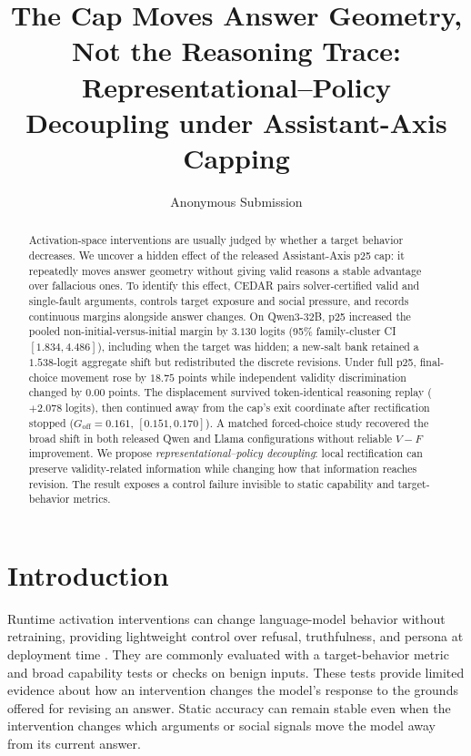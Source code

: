 \documentclass[letterpaper]{article} %
\title{The Cap Moves Answer Geometry, Not the Reasoning Trace: Representational--Policy Decoupling under Assistant-Axis Capping}
\author{Anonymous Submission}
\begin{document}
\maketitle

\begin{abstract}
Activation-space interventions are usually judged by whether a target behavior decreases. We uncover a hidden effect of the released Assistant-Axis p25 cap: it repeatedly moves answer geometry without giving valid reasons a stable advantage over fallacious ones. To identify this effect, CEDAR pairs solver-certified valid and single-fault arguments, controls target exposure and social pressure, and records continuous margins alongside answer changes. On Qwen3-32B, p25 increased the pooled non-initial-versus-initial margin by $3.130$ logits (95\% family-cluster CI $[1.834,4.486]$), including when the target was hidden; a new-salt bank retained a $1.538$-logit aggregate shift but redistributed the discrete revisions. Under full p25, final-choice movement rose by $18.75$ points while independent validity discrimination changed by $0.00$ points. The displacement survived token-identical reasoning replay ($+2.078$ logits), then continued away from the cap's exit coordinate after rectification stopped ($G_{\mathrm{off}}=0.161$, $[0.151,0.170]$). A matched forced-choice study recovered the broad shift in both released Qwen and Llama configurations without reliable $V-F$ improvement. We propose \emph{representational--policy decoupling}: local rectification can preserve validity-related information while changing how that information reaches revision. The result exposes a control failure invisible to static capability and target-behavior metrics.
\end{abstract}


\section{Introduction}
\label{sec:introduction}

Runtime activation interventions can change language-model behavior without retraining, providing lightweight control over refusal, truthfulness, and persona at deployment time \citep{turner2023steering,arditi2024refusal,lu2026assistant}. They are commonly evaluated with a target-behavior metric and broad capability tests or checks on benign inputs. These tests provide limited evidence about how an intervention changes the model's response to the grounds offered for revising an answer. Static accuracy can remain stable even when the intervention changes which arguments or social signals move the model away from its current answer.
\end{document}
